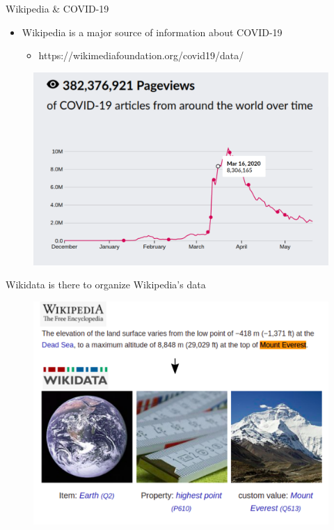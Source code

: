 \documentclass{beamer}
\begin{document}
\begin{frame}{Wikipedia & COVID-19}

\begin{itemize}
    \item Wikipedia is a major source of information about COVID-19
    
    \begin{itemize}
        \item https://wikimediafoundation.org/covid19/data/
    \end{itemize}
    
\end{itemize}

\begin{figure}
\includegraphics[scale=0.45]{fig/wikipedia_access_covid_19.png}
\end{figure}
\end{frame}


\begin{frame}{Wikidata is there to organize Wikipedia's data}

\begin{figure}
\includegraphics[scale=0.45]{fig/intro wikidata.png}
\end{figure}

\end{frame}
\end{document}
